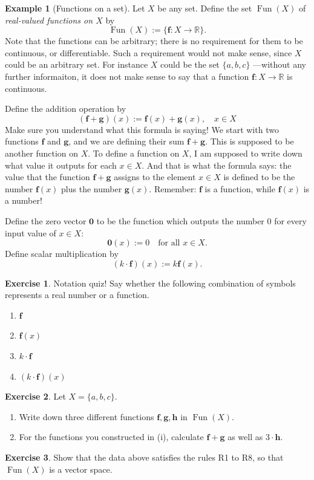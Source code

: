 \documentclass[a4paper,11pt]{book}
\theoremstyle{definition}
\newtheorem{exercise}{Exercise}
\newtheorem{example_environment}{Example}[chapter]
\newcommand{\be}{\begin{equation}}
\newcommand{\ee}{\end{equation}}
\newcommand{\ve}[1]{\mathbf{#1}}
\newenvironment{example}
	{
		\begin{oframed} 
		\begin{example_environment}
	}
	{
		\end{example_environment}
		\end{oframed}
	}
\DeclareMathOperator{\Fun}{Fun}
\begin{document}
\begin{example}[Functions on a set] Let $X$ be any set. Define the set $\Fun(X)$ of {\em real-valued functions on $X$} by
\be
	\Fun(X) := \{ \mathbf{f} : X \rightarrow \mathbb{R} \}.
\ee
Note that the functions can be arbitrary; there is no requirement for them to be continuous, or differentiable. Such a requirement would not make sense, since $X$ could be an arbitrary set. For instance $X$ could be the set $\{a, b, c\}$ ---without any further informaiton, it does not make sense to say that a function $\mathbf{f} : X \rightarrow \mathbb{R}$ is continuous.

Define the addition operation by
\be
 (\mathbf{f} + \mathbf{g}) (x) := \mathbf{f}(x) + \mathbf{g}(x), \quad x \in X
\ee
Make sure you understand what this formula is saying! We start with two functions $\mathbf{f}$ and $\mathbf{g}$, and we are defining their sum $\mathbf{f} + \mathbf{g}$. This is supposed to be another function on $X$. To define a function on $X$, I am supposed to write down what value it outputs for each $x \in X$. And that is what the formula says: the value that the function $\mathbf{f} + \mathbf{g}$ assigns to the element $x \in X$ is defined to be the number $\mathbf{f}(x)$ plus the number $\mathbf{g}(x)$. Remember: $\mathbf{f}$ is a function, while $\mathbf{f}(x)$ is a number!

Define the zero vector $\mathbf{0}$ to be the function which outputs the number $0$ for every input value of $x \in X$:
\be
 \ve{0} (x) := 0 \quad \mbox{for all $x \in X$.}
\ee
Define scalar multiplication by
\be
 (k \cdot \mathbf{f})(x) := k \mathbf{f}(x).
\ee
\begin{exercise} Notation quiz! Say whether the following combination of symbols represents a real number or a function.
	\begin{enumerate}
	\item $\mathbf{f}$
	\item $\mathbf{f}(x)$
	\item $k \cdot \mathbf{f}$
	\item $(k \cdot \mathbf{f})(x)$
	\end{enumerate}
\end{exercise}

\begin{exercise} Let $X = \{a, b, c\}$. 
	\begin{enumerate}
		\item Write down three different functions $\mathbf{f}, \mathbf{g}, \mathbf{h}$ in $\Fun(X)$. 
		\item For the functions you constructed in (i), calculate $\mathbf{f} + \mathbf{g}$ as well as $3 \cdot \mathbf{h}$.
	\end{enumerate}
\end{exercise}

\begin{exercise} Show that the data above satisfies the rules R1 to R8, so that $\Fun(X)$ is a vector space.
\end{exercise}
\end{example}
\end{document}
